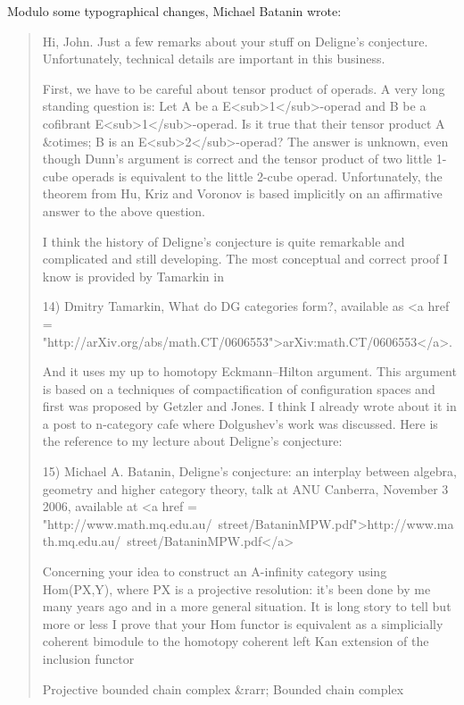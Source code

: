 Modulo some typographical changes, Michael Batanin wrote:

\begin{quote}

   Hi, John.
   Just a few remarks about your stuff on Deligne's conjecture. 
   Unfortunately, technical details are important in this business.

   First, we have to be careful about tensor product of operads. A
   very long standing question is: Let A be a E<sub>1</sub>-operad and
   B be a cofibrant E<sub>1</sub>-operad.  Is it true that their
   tensor product A &otimes; B is an E<sub>2</sub>-operad?  The answer
   is unknown, even though Dunn's argument is correct and the tensor
   product of two little 1-cube operads is equivalent to the little
   2-cube operad.  Unfortunately, the theorem from Hu, Kriz and
   Voronov is based implicitly on an affirmative answer to the above
   question.

   I think the history of Deligne's conjecture is quite remarkable and 
   complicated and still developing. The most conceptual and correct 
   proof I know is provided by Tamarkin in 

   14) Dmitry Tamarkin, What do DG categories form?, available as <a
   href =
   "http://arXiv.org/abs/math.CT/0606553">arXiv:math.CT/0606553</a>.

   And it uses my up to homotopy Eckmann--Hilton argument. This argument 
   is based on a techniques of compactification of configuration spaces 
   and first was proposed by Getzler and Jones.  I think I already wrote 
   about it in a post to n-category cafe where Dolgushev's work was 
   discussed. Here is the reference to my lecture about Deligne's conjecture:

   15) Michael A. Batanin, Deligne's conjecture: an interplay between
   algebra, geometry and higher category theory, talk at ANU Canberra,
   November 3 2006, available at 
   <a href = "http://www.math.mq.edu.au/~street/BataninMPW.pdf">http://www.math.mq.edu.au/~street/BataninMPW.pdf</a>
 
   Concerning your idea to construct an A-infinity category using 
   Hom(PX,Y), where PX is a projective resolution: it's been done by 
   me many years ago and in a more general situation.  It is long story 
   to tell but more or less I prove that your Hom functor is equivalent 
   as a simplicially coherent bimodule to the homotopy coherent left 
   Kan extension of the inclusion functor 

   Projective bounded chain complex &rarr; Bounded chain complex 


\end{quote}

